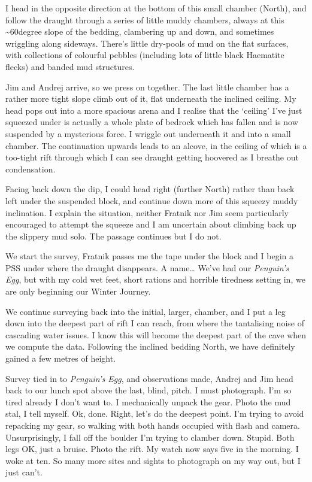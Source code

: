 I head in the opposite direction at the bottom of this small chamber
(North), and follow the draught through a series of little muddy
chambers, always at this \textasciitilde 60degree slope of the bedding,
clambering up and down, and sometimes wriggling along sideways. There's
little dry-pools of mud on the flat surfaces, with collections of
colourful pebbles (including lots of little black Haematite flecks) and
banded mud structures.

Jim and Andrej arrive, so we press on together. The last little chamber
has a rather more tight slope climb out of it, flat underneath the
inclined ceiling. My head pops out into a more spacious arena and I
realise that the `ceiling' I've just squeezed under is actually a whole
plate of bedrock which has fallen and is now suspended by a mysterious
force. I wriggle out underneath it and into a small chamber. The
continuation upwards leads to an alcove, in the ceiling of which is a
too-tight rift through which I can see draught getting hoovered as I
breathe out condensation.

Facing back down the dip, I could head right (further North) rather than
back left under the suspended block, and continue down more of this
squeezy muddy inclination. I explain the situation, neither Fratnik nor
Jim seem particularly encouraged to attempt the squeeze and I am
uncertain about climbing back up the slippery mud solo. The passage
continues but I do not.

We start the survey, Fratnik passes me the tape under the block and I
begin a PSS under where the draught disappears. A name\ldots{} We've had
our \emph{Penguin's Egg}, but with my cold wet feet, short rations and
horrible tiredness setting in, we are only beginning our Winter Journey.

We continue surveying back into the initial, larger, chamber, and I put
a leg down into the deepest part of rift I can reach, from where the
tantalising noise of cascading water issues. I know this will become the
deepest part of the cave when we compute the data. Following the
inclined bedding North, we have definitely gained a few metres of
height.

Survey tied in to \emph{Penguin's Egg}, and observations made, Andrej
and Jim head back to our lunch spot above the last, blind, pitch. I must
photograph. I'm so tired already I don't want to. I mechanically unpack
the gear. Photo the mud stal, I tell myself. Ok, done. Right, let's do
the deepest point. I'm trying to avoid repacking my gear, so walking
with both hands occupied with flash and camera. Unsurprisingly, I fall
off the boulder I'm trying to clamber down. Stupid. Both legs OK, just a
bruise. Photo the rift. My watch now says five in the morning. I woke at
ten. So many more sites and sights to photograph on my way out, but I
just can't.

